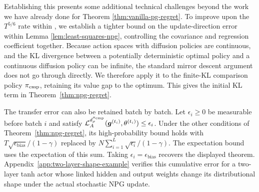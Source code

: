 Establishing this presents some additional technical challenges beyond the work we have already done for Theorem \ref{thm:vanilla-pg-regret}. To improve upon the $T^{5/6}$ rate within \citet{agarwal2021theory}, we establish a tighter bound on the update-direction error within Lemma \ref{lem:least-squares-npg}, controlling the covariance and regression coefficient together. Because action spaces with diffusion policies are continuous, and the KL divergence between a potentially deterministic optimal policy and a continuous diffusion policy can be infinite, the standard mirror descent argument does not go through directly. We therefore apply it to the finite-KL comparison policy $\pi_{\rm cmp}$, retaining its value gap to the optimum. This gives the initial KL term in Theorem~\ref{thm:npg-regret}.


\begin{rmk}
The transfer error can also be retained batch by batch. Let
$\epsilon_i\geq0$ be measurable before batch $i$ and satisfy
${\mathcal{L}}_A^{d_\rho^{\pi_{\rm cmp}}}(\bm{g}^{(t_i)},\theta^{(t_i)})\leq\epsilon_i$.
Under the other conditions of Theorem~\ref{thm:npg-regret}, its
high-probability bound holds with
$T\sqrt{\epsilon_{\mathrm{bias}}}/(1-\gamma)$ replaced by
$N\sum_{i=1}^L\sqrt{\epsilon_i}/(1-\gamma)$.
The expectation bound uses the expectation of this sum. Taking
$\epsilon_i=\epsilon_{\mathrm{bias}}$ recovers the displayed theorem.
Appendix~\ref{app:two-layer-shape-example} verifies this cumulative error for a
two-layer tanh actor whose linked hidden and output weights change its
distributional shape under the actual stochastic NPG update.
\end{rmk}

